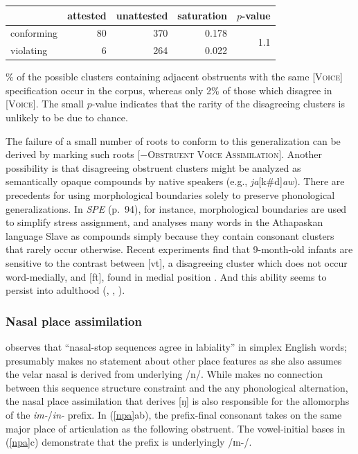 \begin{example}
\begin{tabular}{l r r r r}
\toprule
           & attested & unattested & saturation & $p$-value                   \\
\midrule
conforming & 80       & 370        & 0.178      & \multirow{2}{*}{1.1\e{-11}} \\
violating  &  6       & 264        & 0.022                                    \\
\bottomrule
\end{tabular}
\end{example}

\% of the possible clusters containing adjacent obstruents with the same [\textsc{Voice}] specification occur in the corpus, whereas only 2\%  of those which disagree in [\textsc{Voice}]. The small $p$-value indicates that the rarity of the disagreeing clusters is unlikely to be due to chance.

The failure of a small number of roots to conform to this generalization can be derived by marking such roots [$-$\textsc{Obstruent Voice Assimilation}]. Another possibility is that disagreeing obstruent clusters might be analyzed as semantically opaque compounds by native speakers (e.g., \emph{ja}[k\#d]\emph{aw}). There are precedents for using morphological boundaries solely to preserve phonological generalizations. In \emph{SPE} (p.~94), for instance, morphological boundaries are used to simplify stress assignment, and \citet[][546]{Rice2009d} analyses many words in the Athapaskan language Slave as compounds simply because they contain consonant clusters that rarely occur otherwise. Recent experiments find that 9-month-old infants are sensitive to the contrast between [vt], a disagreeing cluster which does not occur word-medially, and [ft], found in medial position \citep{Mattys2001b}. And this ability seems to persist into adulthood (\citealt{Brown1956}, \citealt{Norris1997}, \citealt{McQueen1998}).

\subsubsection{Nasal place assimilation} \label{npasection}

\citet[][175]{Pierrehumbert1994} observes that ``nasal-stop sequences agree in labiality'' in simplex English words; \citeauthor{Pierrehumbert1994} presumably makes no statement about other place features as she also assumes the velar nasal is derived from underlying /n/. While \citeauthor{Pierrehumbert1994} makes no connection between this sequence structure constraint and the any phonological alternation, the nasal place assimilation that derives [ŋ] is also responsible for the allomorphs of the \emph{im-}/\emph{in-} prefix. In (\ref{npa}ab), the prefix-final consonant takes on the same major place of articulation as the following obstruent. The vowel-initial bases in (\ref{npa}c) demonstrate that the prefix is underlyingly /ɪn-/. 

